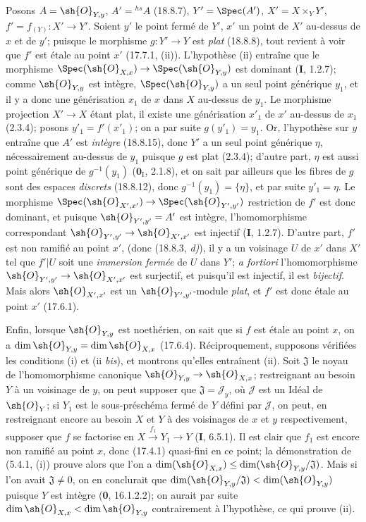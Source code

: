 Posons $A=\sh{O}_{Y,y}$, $A'={}^{hs}\!A$ (18.8.7), $Y'=\Spec(A')$, $X'=X\times_Y Y'$, $f'=f_{(Y)}:X'\to Y'$. Soient $y'$ le point fermé de $Y'$, $x'$ un point de $X'$ au-dessus de $x$ et de $y'$; puisque le morphisme $g:Y'\to Y$ est \emph{plat} (18.8.8), tout revient à voir que $f'$ est étale au point $x'$ (17.7.1, (ii)). L'hypothèse (ii) entraîne que le morphisme $\Spec(\sh{O}_{X,x})\to\Spec(\sh{O}_{Y,y})$ est dominant (\textbf{I}, 1.2.7); comme $\sh{O}_{Y,y}$ est intègre, $\Spec(\sh{O}_{Y,y})$ a un seul point générique $y_1$, et il y a donc une générisation $x_1$ de $x$ dans $X$ au-dessus de $y_1$. Le morphisme projection $X'\to X$ étant plat, il existe une générisation $x'_1$ de $x'$ au-dessus de $x_1$ (2.3.4); posons $y'_1=f'(x'_1)$; on a par suite $g(y'_1)=y_1$. Or, l'hypothèse sur $y$ entraîne que $A'$ est \emph{intègre} (18.8.15), donc $Y'$ a un seul point générique $\eta$, nécessairement au-dessus de $y_1$ puisque $g$
est plat (2.3.4); d'autre part, $\eta$ est aussi point générique de $g^{-1}(y_1)$ ($\mathbf{0}_{\mathrm I}$, 2.1.8), et on sait par ailleurs que les fibres de $g$ sont des espaces \emph{discrets} (18.8.12), donc $g^{-1}(y_1)=\{\eta\}$, et par suite $y'_1=\eta$. Le morphisme $\Spec(\sh{O}_{X',x'})\to\Spec(\sh{O}_{Y',y'})$ restriction de $f'$ est donc dominant, et puisque $\sh{O}_{Y',y'}=A'$ est intègre, l'homomorphisme correspondant $\sh{O}_{Y',y'}\to\sh{O}_{X',x'}$ est injectif (\textbf{I}, 1.2.7). D'autre part, $f'$ est non ramifié au point $x'$, (donc (18.8.3, \emph{d)}), il y a un voisinage $U$ de $x'$ dans $X'$ tel que $f'|U$ soit une \emph{immersion fermée} de $U$ dans $Y'$; \emph{a fortiori} l'homomorphisme $\sh{O}_{Y',y'}\to\sh{O}_{X',x'}$ est surjectif, et puisqu'il est injectif, il est \emph{bijectif}. Mais alors $\sh{O}_{X',x'}$ est un $\sh{O}_{Y',y'}$-module \emph{plat}, et $f'$ est donc étale au point $x'$ (17.6.1).

Enfin, lorsque $\sh{O}_{Y,y}$ est noethérien, on sait que si $f$ est étale au point $x$, on a $\dim\sh{O}_{Y,y}=\dim\sh{O}_{X,x}$ (17.6.4). Réciproquement, supposons vérifiées les conditions (i) et (ii \emph{bis}), et montrons qu'elles entraînent (ii). Soit $\mathfrak J$ le noyau de l'homomorphisme canonique $\sh{O}_{Y,y}\to\sh{O}_{X,x}$; restreignant au besoin $Y$ à un voisinage de $y$, on peut supposer que $\mathfrak J=\mathscr{J}_y$, où $\mathscr{J}$ est un Idéal de $\sh{O}_Y$; si $Y_1$ est le sous-préschéma fermé de $Y$ défini par $\mathscr{J}$, on peut, en restreignant encore au besoin $X$ et $Y$ à des voisinages de $x$ et $y$ respectivement, supposer que $f$ se factorise en $X\xrightarrow{f_1}Y_1\to Y$ (\textbf{I}, 6.5.1). Il est clair que $f_1$ est encore non ramifié au point $x$, donc (17.4.1) quasi-fini en ce point; la démonstration de (5.4.1, (i)) prouve alors que l'on a $\dim(\sh{O}_{X,x})\leq\dim(\sh{O}_{Y,y}/\mathfrak J)$. Mais si l'on avait $\mathfrak J\neq0$, on en conclurait que $\dim(\sh{O}_{Y,y}/\mathfrak J)<\dim(\sh{O}_{Y,y})$ puisque $Y$ est intègre (\textbf{0}, 16.1.2.2); on aurait par suite $\dim\sh{O}_{X,x}<\dim\sh{O}_{Y,y}$ contrairement à l'hypothèse, ce qui prouve (ii).

